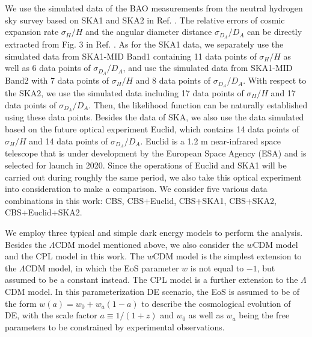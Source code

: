 \documentclass[aps,prd,amsmath,amssymb,showpacs,floats,floatfix,nofootinbib,reprint]{revtex4-1}
\begin{document}
We use the simulated data of the BAO measurements from the neutral hydrogen sky survey based on SKA1 and SKA2 in Ref. \cite{Bull:2015nra}. The relative errors of cosmic expansion rate $\sigma_{H}/H$ and the angular diameter distance $\sigma_{D_A}/D_A$ can be directly extracted from Fig. 3 in Ref. \cite{Bull:2015nra}.
As for the SKA1 data, we separately use the simulated data from SKA1-MID Band1 containing 11 data points of $\sigma_{H}/H$ as well as 6 data points of $\sigma_{D_A}/D_A$, and use the simulated data from SKA1-MID Band2 with 7 data points of $\sigma_{H}/H$ and 8 data points of $\sigma_{D_A}/D_A$. With respect to the SKA2, we use the simulated data including 17 data points of $\sigma_{H}/H$ and 17 data points of $\sigma_{D_A}/D_A$. Then, the likelihood function can be naturally established using these data points. Besides the data of SKA, we also use the data simulated based on the future optical experiment Euclid, which contains 14 data points of $\sigma_{H}/H$ and 14 data points of $\sigma_{D_A}/D_A$. Euclid is a 1.2 m near-infrared space telescope that is under development by the European Space Agency (ESA) and is selected for launch in 2020.  Since the operations of Euclid and SKA1 will be carried out during roughly the same period, we also take this optical experiment into consideration to make a comparison. We consider five various data combinations in this work: CBS, CBS+Euclid, CBS+SKA1, CBS+SKA2, CBS+Euclid+SKA2.

We employ three typical and simple dark energy models to perform the analysis. Besides the $\Lambda$CDM model mentioned above, we also consider the $w$CDM model and the CPL model in this work. The $w$CDM model is the simplest extension to the $\Lambda$CDM model, in which the EoS parameter $w$ is not equal to $-1$, but assumed to be a constant instead. The CPL model is a further extension to the $\Lambda$CDM model. In this parameterization DE scenario, the EoS is assumed to be of the form $w(a)=w_{0}+w_{a}(1-a)$ to describe the cosmological evolution of DE, with the scale factor $a\equiv 1/(1+z)$ and $w_{0}$ as well as $w_{a}$ being the free parameters to be constrained by experimental observations.
\end{document}
